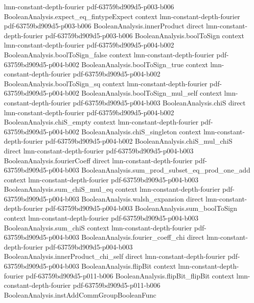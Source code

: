 \begin{lemma}
  {lmn-constant-depth-fourier}
  {pdf-63759bd909d5-p003-b006}
\proofstep
  {BooleanAnalysis.expect_eq_fintypeExpect}
  {context}
  {lmn-constant-depth-fourier}
  {pdf-63759bd909d5-p003-b006}
\proofstep
  {BooleanAnalysis.innerProduct}
  {direct}
  {lmn-constant-depth-fourier}
  {pdf-63759bd909d5-p003-b006}
\proofstep
  {BooleanAnalysis.boolToSign}
  {context}
  {lmn-constant-depth-fourier}
  {pdf-63759bd909d5-p004-b002}
\proofstep
  {BooleanAnalysis.boolToSign_false}
  {context}
  {lmn-constant-depth-fourier}
  {pdf-63759bd909d5-p004-b002}
\proofstep
  {BooleanAnalysis.boolToSign_true}
  {context}
  {lmn-constant-depth-fourier}
  {pdf-63759bd909d5-p004-b002}
\proofstep
  {BooleanAnalysis.boolToSign_sq}
  {context}
  {lmn-constant-depth-fourier}
  {pdf-63759bd909d5-p004-b002}
\proofstep
  {BooleanAnalysis.boolToSign_mul_self}
  {context}
  {lmn-constant-depth-fourier}
  {pdf-63759bd909d5-p004-b003}
\proofstep
  {BooleanAnalysis.chiS}
  {direct}
  {lmn-constant-depth-fourier}
  {pdf-63759bd909d5-p004-b002}
\proofstep
  {BooleanAnalysis.chiS_empty}
  {context}
  {lmn-constant-depth-fourier}
  {pdf-63759bd909d5-p004-b002}
\proofstep
  {BooleanAnalysis.chiS_singleton}
  {context}
  {lmn-constant-depth-fourier}
  {pdf-63759bd909d5-p004-b002}
\proofstep
  {BooleanAnalysis.chiS_mul_chiS}
  {direct}
  {lmn-constant-depth-fourier}
  {pdf-63759bd909d5-p004-b003}
\proofstep
  {BooleanAnalysis.fourierCoeff}
  {direct}
  {lmn-constant-depth-fourier}
  {pdf-63759bd909d5-p004-b003}
\proofstep
  {BooleanAnalysis.sum_prod_subset_eq_prod_one_add}
  {context}
  {lmn-constant-depth-fourier}
  {pdf-63759bd909d5-p004-b003}
\proofstep
  {BooleanAnalysis.sum_chiS_mul_eq}
  {context}
  {lmn-constant-depth-fourier}
  {pdf-63759bd909d5-p004-b003}
\proofstep
  {BooleanAnalysis.walsh_expansion}
  {direct}
  {lmn-constant-depth-fourier}
  {pdf-63759bd909d5-p004-b003}
\proofstep
  {BooleanAnalysis.sum_boolToSign}
  {context}
  {lmn-constant-depth-fourier}
  {pdf-63759bd909d5-p004-b003}
\proofstep
  {BooleanAnalysis.sum_chiS}
  {context}
  {lmn-constant-depth-fourier}
  {pdf-63759bd909d5-p004-b003}
\proofstep
  {BooleanAnalysis.fourier_coeff_chi}
  {direct}
  {lmn-constant-depth-fourier}
  {pdf-63759bd909d5-p004-b003}
\proofstep
  {BooleanAnalysis.innerProduct_chi_self}
  {direct}
  {lmn-constant-depth-fourier}
  {pdf-63759bd909d5-p004-b003}
\proofstep
  {BooleanAnalysis.flipBit}
  {context}
  {lmn-constant-depth-fourier}
  {pdf-63759bd909d5-p011-b006}
\proofstep
  {BooleanAnalysis.flipBit_flipBit}
  {context}
  {lmn-constant-depth-fourier}
  {pdf-63759bd909d5-p011-b006}
\proofstep
  {BooleanAnalysis.instAddCommGroupBooleanFunc}

\end{lemma}
